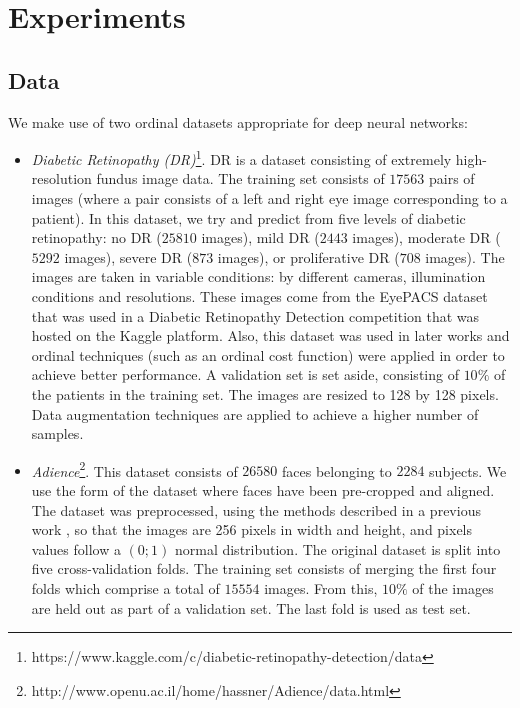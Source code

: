 \documentclass[10pt, a4paper, titlepage, twocolumn]{article}
\begin{document}
	\section{Experiments}
	\label{sect:experiments}
	\subsection{Data}
	We make use of two ordinal datasets appropriate for deep neural networks:
	
	\begin{itemize}
		\item \textit{Diabetic Retinopathy (DR)}\footnote{https://www.kaggle.com/c/diabetic-retinopathy-detection/data}. DR is a dataset consisting of extremely high-resolution fundus image data. The training set consists of $17563$ pairs of images (where a  pair consists of a left and right eye image corresponding to a patient). In this dataset, we try and predict from five levels of diabetic retinopathy: no DR ($25810$ images), mild DR ($2443$ images), moderate DR ($5292$ images), severe DR ($873$ images), or proliferative DR ($708$ images). The images are taken in variable conditions: by different cameras, illumination conditions and resolutions. These images come from the EyePACS dataset that was used in a Diabetic Retinopathy Detection competition that was hosted on the Kaggle platform. Also, this dataset was used in later works \cite{de2018weighted}\cite{nebot2016diabetic} and ordinal techniques (such as an ordinal cost function) were applied in order to achieve better performance. A validation set is set aside, consisting of $10\%$ of the patients in the training set. The images are resized to 128 by 128 pixels. Data augmentation techniques are applied to achieve a higher number of samples.
		
		\item \textit{Adience}\footnote{http://www.openu.ac.il/home/hassner/Adience/data.html}. This dataset consists of $26580$ faces belonging to $2284$ subjects. We use the form of the dataset where faces have been pre-cropped and aligned. The dataset was preprocessed, using the methods described in a previous work \cite{beckham2017unimodal}, so that the images are 256 pixels in width and height, and pixels values follow a $(0;1)$ normal distribution. The original dataset is split into five cross-validation folds. The training set consists of merging the first four folds which comprise a total of $15554$ images. From this, $10\%$ of the images are held out as part of a validation set. The last fold is used as test set.
	\end{itemize}
	
\end{document}
